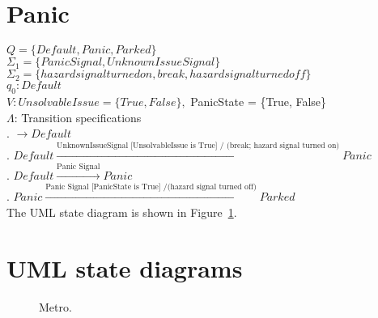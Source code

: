 \documentclass[12pt]{article}
\begin{document}
\begin{spacing}{1.5}
\section{Panic}

\noindent $Q = \{Default, Panic, Parked\}$\\
\noindent $\Sigma_1 = \{Panic Signal, UnknownIssueSignal\}$\\
\noindent $\Sigma_2 = \{hazard signal turned on, break, hazard signal turned off\}$\\
\noindent $q_0: Default$\\
\noindent $V: UnsolvableIssue = \{True, False\}, $ PanicState = \{True, False\}\\
\noindent $\Lambda$: Transition specifications\\

. $\rightarrow Default$\\
. $Default \xrightarrow {\text {UnknownIssueSignal [UnsolvableIssue is True] / (break; hazard signal turned on)}} Panic$\\
. $Default \xrightarrow {\text {Panic Signal}} Panic$\\
. $Panic \xrightarrow {\text {Panic Signal [PanicState is True] /(hazard signal turned off)}} Parked$\\


\noindent The UML state diagram is shown in Figure~\ref{fig:metro-fig}.

\newpage
\section{UML state diagrams}

\begin{figure}[h!]
	\centering
		
		  \caption{Metro.}
  \label{fig:metro-fig}
\end{figure}

\end{spacing}
\end{document}
